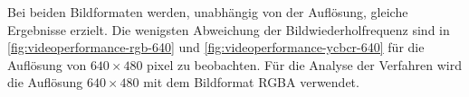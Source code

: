 Bei beiden Bildformaten werden, unabhängig von der Auflösung, gleiche Ergebnisse erzielt. Die wenigsten Abweichung der
 Bildwiederholfrequenz sind in \autoref{fig:videoperformance-rgb-640} und \autoref{fig:videoperformance-ycbcr-640} für die
 Auflösung von $640 \times 480$ \gls{pixel} zu beobachten. Für die Analyse der Verfahren wird die Auflösung
 $640 \times 480$ mit dem Bildformat RGBA verwendet.

